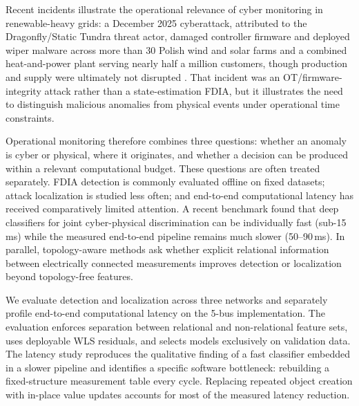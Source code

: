 \documentclass[conference]{IEEEtran}
\begin{document}
Recent incidents illustrate the operational relevance of cyber monitoring in renewable-heavy grids: a December 2025 cyberattack, attributed to the Dragonfly/Static Tundra threat actor, damaged controller firmware and deployed wiper malware across more than 30 Polish wind and solar farms and a combined heat-and-power plant serving nearly half a million customers, though production and supply were ultimately not disrupted \cite{certpolska2026incident}. That incident was an OT/firmware-integrity attack rather than a state-estimation FDIA, but it illustrates the need to distinguish malicious anomalies from physical events under operational time constraints.

Operational monitoring therefore combines three questions: whether an anomaly is cyber or physical, where it originates, and whether a decision can be produced within a relevant computational budget. These questions are often treated separately. FDIA detection is commonly evaluated offline on fixed datasets; attack localization is studied less often; and end-to-end computational latency has received comparatively limited attention. A recent benchmark \cite{abukhousa2026latency} found that deep classifiers for joint cyber-physical discrimination can be individually fast (sub-15\,ms) while the measured end-to-end pipeline remains much slower (50--90\,ms). In parallel, topology-aware methods ask whether explicit relational information between electrically connected measurements improves detection or localization beyond topology-free features.

We evaluate detection and localization across three networks and separately profile end-to-end computational latency on the 5-bus implementation. The evaluation enforces separation between relational and non-relational feature sets, uses deployable WLS residuals, and selects models exclusively on validation data. The latency study reproduces the qualitative finding of a fast classifier embedded in a slower pipeline \cite{abukhousa2026latency} and identifies a specific software bottleneck: rebuilding a fixed-structure measurement table every cycle. Replacing repeated object creation with in-place value updates accounts for most of the measured latency reduction.
\end{document}
